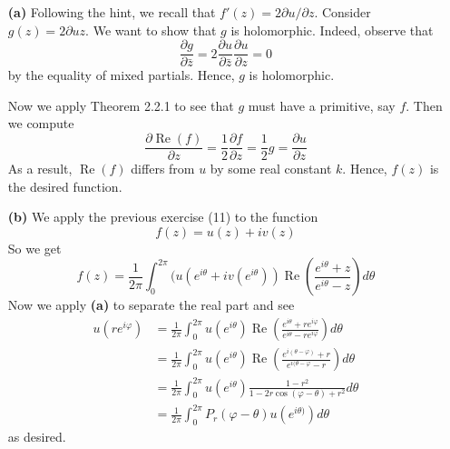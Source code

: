 \documentclass{article}
\newcommand{\exercise}[1]{\noindent{\textbf{Exercise #1:}}}
\newcommand{\der}[2]{\frac{\partial #1}{\partial #2}}
\begin{document}
\exercise{2.6.12}
\begin{enumerate}
\item[\textbf{(a)}] Following the hint, we recall that $f'(z) =
2\partial{u}/\partial{z}$. Consider $g(z) =
2\partial{u}{z}$. We want to show that $g$ is holomorphic. Indeed,
observe that
\[
\der{g}{\bar{z}} = 2\der{u}{\bar{z}}\der{u}{z} = 0
\]
by the equality of mixed partials. Hence, $g$ is holomorphic.

Now we apply Theorem 2.2.1 to see that $g$ must have a primitive, say
$f$. Then we compute
\[
\der{\mathrel{\text{Re}}(f)}{z} = \frac{1}{2}\der{f}{z} = \frac{1}{2}g
= \der{u}{z}
\]
As a result, $\mathrel{\text{Re}}(f)$ differs from $u$ by some real
constant $k$. Hence, $f(z)$ is the desired function.

\item[\textbf{(b)}] We apply the previous exercise (11) to the function
\[
f(z) = u(z) + iv(z)
\]
So we get
\[
f(z) = \frac{1}{2\pi}\int_0^{2\pi} (u(e^{i\theta} +
iv(e^{i\theta}))\mathrel{\text{Re}}\left(\frac{e^{i\theta}+z}
  {e^{i\theta}-z}\right)d\theta
\]
Now we apply \textbf{(a)} to separate the real part and see
\begin{align*}
  u(re^{i\varphi}) &= \frac{1}{2\pi}\int_0^{2\pi}
  u(e^{i\theta})\mathrel{\text{Re}}\left(\frac{e^{i\theta} +
      re^{i\varphi}}{e^{i\theta} - re^{i\varphi}}\right)d\theta \\
  &= \frac{1}{2\pi}\int_0^{2\pi}
  u(e^{i\theta})\mathrel{\text{Re}}\left(\frac{e^{i(\theta - \varphi)
      } +
      r}{e^{i(\theta -\varphi}- r}\right)d\theta \\
  &= \frac{1}{2\pi}\int_0^{2\pi}
  u(e^{i\theta})\frac{1-r^2}{1-2r\cos(\varphi - \theta)+r^2}d\theta\\
  &= \frac{1}{2\pi}\int_0^{2\pi} P_r(\varphi - \theta)u(e^{i\theta)})d\theta
\end{align*}
as desired.
\end{enumerate}
\end{document}
